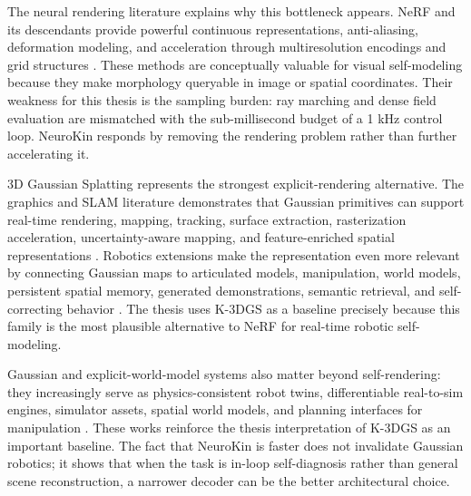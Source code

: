 \documentclass[12pt,a4paper,oneside]{report}
\begin{document}
The neural rendering literature explains why this bottleneck appears. NeRF and its descendants provide powerful continuous representations, anti-aliasing, deformation modeling, and acceleration through multiresolution encodings and grid structures \cite{barron2021mip,li2021nerf,mildenhall2020nerf,pumarola2021d,muller2022instant,barron2023zipnerf,park2021nerfies}. These methods are conceptually valuable for visual self-modeling because they make morphology queryable in image or spatial coordinates. Their weakness for this thesis is the sampling burden: ray marching and dense field evaluation are mismatched with the sub-millisecond budget of a 1 kHz control loop. NeuroKin responds by removing the rendering problem rather than further accelerating it.

3D Gaussian Splatting represents the strongest explicit-rendering alternative. The graphics and SLAM literature demonstrates that Gaussian primitives can support real-time rendering, mapping, tracking, surface extraction, rasterization acceleration, uncertainty-aware mapping, and feature-enriched spatial representations \cite{kerbl20233d,matsuki2024gaussian,keetha2024splattam,lassanske2024gaurast,guedon2024sugar,kim2024garfield,thirgood2025featureslam,tran2025varsplat}. Robotics extensions make the representation even more relevant by connecting Gaussian maps to articulated models, manipulation, world models, persistent spatial memory, generated demonstrations, semantic retrieval, and self-correcting behavior \cite{weng2024neural,li2025art,wu2024aomgen,wu2025urdfanything,xu2025motionanymesh,wang2025kinematify,zhang2025simart,wang2025artllm,guo2025articulatedgs,yu2025artgs,wu2025reartgs,dai2025freeartgs,chen2025freegaussian,lu2024manigaussian,pan2025selfcorrecting,yang2025robosplat,tao2025robopearls,lin2025pogs,xie2025robmrag,lu2025gsmem,zhang2025actron3d}. The thesis uses K-3DGS as a baseline precisely because this family is the most plausible alternative to NeRF for real-time robotic self-modeling.

Gaussian and explicit-world-model systems also matter beyond self-rendering: they increasingly serve as physics-consistent robot twins, differentiable real-to-sim engines, simulator assets, spatial world models, and planning interfaces for manipulation \cite{lou2024robogs,lou2026drex,sun2026digitaltwin,li2024explicit,gao2024mirage2matter,jiang2024phystwin,jiang2025gsworld}. These works reinforce the thesis interpretation of K-3DGS as an important baseline. The fact that NeuroKin is faster does not invalidate Gaussian robotics; it shows that when the task is in-loop self-diagnosis rather than general scene reconstruction, a narrower decoder can be the better architectural choice.
\end{document}
